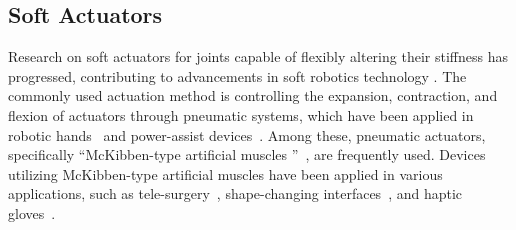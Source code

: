 
\subsection{Soft Actuators }\label{2_3}

Research on soft actuators  for joints capable of flexibly altering their stiffness has progressed, contributing to advancements in soft robotics technology .
The commonly used actuation method is controlling the expansion, contraction, and flexion of actuators through pneumatic systems, which have been applied in robotic hands~\cite{abondance2020dexterous} and power-assist devices~\cite{yap2015soft}. 
Among these, pneumatic actuators, specifically ``McKibben-type artificial muscles ''~\cite{tondu2012modelling, zhang2017modeling, Schulte1961TheCO, meller2016improving}, are frequently used.
Devices utilizing McKibben-type artificial muscles have been applied in various applications, such as tele-surgery~\cite{ForcepsManipulator}, shape-changing interfaces~\cite{MckkibenInteraction}, and haptic gloves~\cite{Use_of_McKibben_Muscle}.

